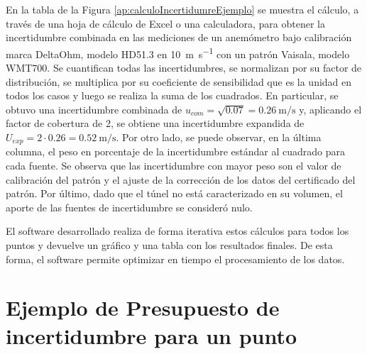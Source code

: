 En la tabla de la Figura \ref{ap:calculoIncertidumreEjemplo} se muestra el cálculo, a través de una hoja de cálculo de Excel o una calculadora, para obtener la incertidumbre combinada en las mediciones de un anemómetro bajo calibración marca DeltaOhm, modelo HD51.3 en \SI{10}{\meter\per\second} con un patrón Vaisala, modelo WMT700. Se cuantifican todas las incertidumbres, se normalizan por su factor de distribución, se multiplica por su coeficiente de sensibilidad que es la unidad en todos los casos y luego se realiza la suma de los cuadrados. En particular, se obtuvo una incertidumbre combinada de $u_{com} = \sqrt{0.07} = \SI{0.26}{\meter\per\second}$ y, aplicando el factor de cobertura de 2, se obtiene una incertidumbre expandida de $U_{exp} = 2 \cdot 0.26 = \SI{0.52}{\meter\per\second}$. Por otro lado, se puede observar, en la última columna, el peso en porcentaje de la incertidumbre estándar al cuadrado para cada fuente. Se observa que las incertidumbre con mayor peso son el valor de calibración del patrón y el ajuste de la corrección de los datos del certificado del patrón. Por último, dado que el túnel no está caracterizado en su volumen, el aporte de las fuentes de incertidumbre se consideró nulo.

El software desarrollado realiza de forma iterativa estos cálculos para todos los puntos y devuelve un gráfico y una tabla con los resultados finales. De esta forma, el software permite optimizar en tiempo el procesamiento de los datos.


\newpage
{}
\section{Ejemplo de Presupuesto de incertidumbre para un punto}

